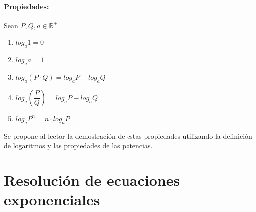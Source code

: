 \paragraph{Propiedades: }
Sean $P,Q,a \in \mathbb{R}^+ $
\begin{enumerate}
\item $log_a 1=0$
\item $log_a a=1$
\item $log_a (P\cdot Q)=log_a P +log_a Q$
\item $log_a \left(\dfrac{P}{Q}\right)=log_a P -log_a Q$
\item $log_a P^n=n\cdot log_a P$
\end{enumerate}

\begin{ejerci}
Se propone al lector la demostración de estas propiedades utilizando la definición de logaritmos y las propiedades de las potencias.
\end{ejerci}
\newpage
\section{Resolución de ecuaciones exponenciales}

